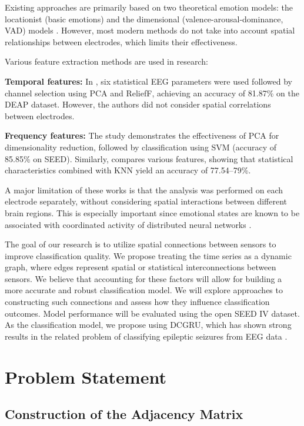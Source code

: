 \documentclass[12pt, twoside]{article}
\begin{document}
Existing approaches are primarily based on two theoretical emotion models: the locationist (basic emotions) and the dimensional (valence-arousal-dominance, VAD) models \cite{3}. However, most modern methods do not take into account spatial relationships between electrodes, which limits their effectiveness.

Various feature extraction methods are used in research:

\textbf{Temporal features:} In \cite{4}, six statistical EEG parameters were used followed by channel selection using PCA and ReliefF, achieving an accuracy of 81.87\% on the DEAP dataset. However, the authors did not consider spatial correlations between electrodes.

\textbf{Frequency features:} The study \cite{5} demonstrates the effectiveness of PCA for dimensionality reduction, followed by classification using SVM (accuracy of 85.85\% on SEED). Similarly, \cite{6} compares various features, showing that statistical characteristics combined with KNN yield an accuracy of 77.54--79\%.

A major limitation of these works is that the analysis was performed on each electrode separately, without considering spatial interactions between different brain regions. This is especially important since emotional states are known to be associated with coordinated activity of distributed neural networks \cite{7}.

The goal of our research is to utilize spatial connections between sensors to improve classification quality. We propose treating the time series as a dynamic graph, where edges represent spatial or statistical interconnections between sensors. We believe that accounting for these factors will allow for building a more accurate and robust classification model. We will explore approaches to constructing such connections and assess how they influence classification outcomes. Model performance will be evaluated using the open SEED IV dataset. As the classification model, we propose using DCGRU, which has shown strong results in the related problem of classifying epileptic seizures from EEG data \cite{DCGRU}.

\section{Problem Statement}

\subsection{Construction of the Adjacency Matrix}
\end{document}
